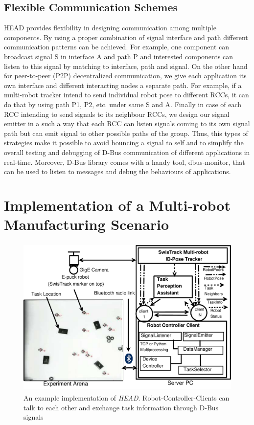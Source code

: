 \documentclass{ifacconf}
\begin{document}
\subsection{Flexible Communication  Schemes}
HEAD provides flexibility in designing communication among multiple components. By using a proper combination of signal interface and path different communication patterns can be achieved. For example, one component can broadcast signal S in interface A and path P and interested components can listen to this signal by matching to interface, path and signal. On the other hand for peer-to-peer (P2P) decentralized communication,  we give each application its own interface and different interacting nodes a separate path.  For example, if a multi-robot tracker intend to send individual robot pose to different RCCs, it can do that by using path P1,  P2, etc. under same S and A. Finally in case of each RCC intending to send signals to its neighbour RCCs, we design our signal emitter in a such a way that each RCC can listen signals coming to its own signal path but can emit  signal to other possible paths of the group. Thus,  this types of strategies  make it possible to avoid bouncing a signal to self and to simplify the overall testing and debugging of D-Bus communication of different applications in real-time. Moreover, D-Bus library comes with a handy tool, dbus-monitor, that can be used to listen to messages and debug the behaviours of applications.

\section{Implementation of a Multi-robot Manufacturing Scenario}
\begin{figure}
\begin{center}
\includegraphics[width=12cm,height=8cm]{./dia-files/RIL-Expt-Setup3}    %
\caption{An example implementation of {\em HEAD}. Robot-Controller-Clients can talk to each other and exchange task information through D-Bus signals} 
\label{fig:abstract-arch}
\end{center}
\end{figure}
\end{document}
